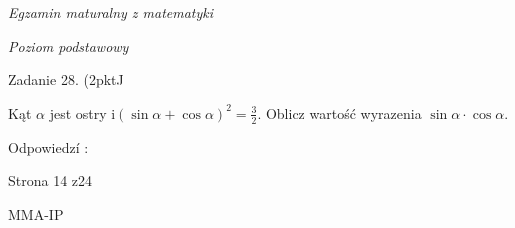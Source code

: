 \documentclass[a4paper,12pt]{article}
\begin{document}
{\it Egzamin maturalny z matematyki}

{\it Poziom podstawowy}

Zadanie 28. (2pktJ

Kąt $\alpha$ jest ostry $\displaystyle \mathrm{i}(\sin\alpha+\cos\alpha)^{2}=\frac{3}{2}$. Oblicz wartość wyrazenia $\sin\alpha\cdot\cos\alpha.$

Odpowiedzí :

Strona 14 z24

MMA-IP
\end{document}
